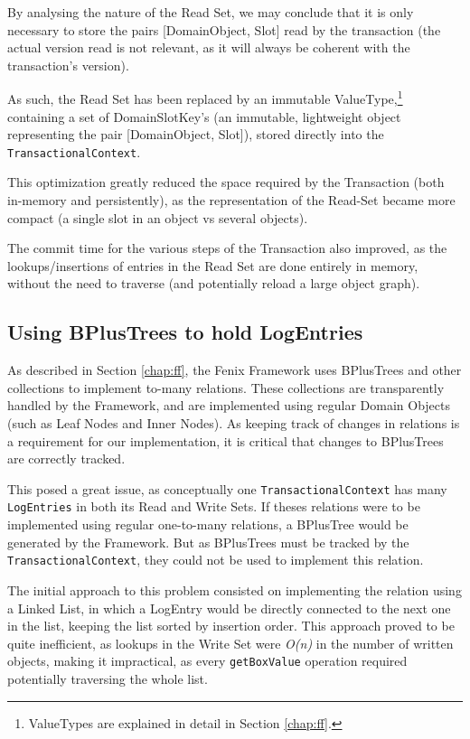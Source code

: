 \documentclass{llncs}
\begin{document}
By analysing the nature of the Read Set, we may conclude that it is
only necessary to store the pairs [DomainObject, Slot] read by the
transaction (the actual version read is not relevant, as it will
always be coherent with the transaction's version).

As such, the Read Set has been replaced by an immutable
ValueType,\footnote{ValueTypes are explained in detail in Section
  \ref{chap:ff}.} containing a set of DomainSlotKey's (an immutable,
lightweight object representing the pair [DomainObject, Slot]), stored
directly into the \texttt{TransactionalContext}.

This optimization greatly reduced the space required by the
Transaction (both in-memory and persistently), as the representation
of the Read-Set became more compact (a single slot in an object vs
several objects).

The commit time for the various steps of the Transaction also
improved, as the lookups/insertions of entries in the Read Set are
done entirely in memory, without the need to traverse (and
potentially reload a large object graph).

\subsection{Using BPlusTrees to hold LogEntries}

As described in Section \ref{chap:ff}, the Fenix Framework uses
BPlusTrees and other collections to implement to-many relations. These
collections are transparently handled by the Framework, and are
implemented using regular Domain Objects (such as Leaf Nodes and Inner
Nodes). As keeping track of changes in relations is a requirement for
our implementation, it is critical that changes to BPlusTrees are
correctly tracked.

This posed a great issue, as conceptually one
\texttt{TransactionalContext} has many \texttt{LogEntries} in both its
Read and Write Sets. If theses relations were to be implemented using
regular one-to-many relations, a BPlusTree would be generated by the
Framework. But as BPlusTrees must be tracked by the
\texttt{TransactionalContext}, they could not be used to implement
this relation.

The initial approach to this problem consisted on implementing the
relation using a Linked List, in which a LogEntry would be directly
connected to the next one in the list, keeping the list sorted by
insertion order. This approach proved to be quite inefficient, as
lookups in the Write Set were {\it O(n)} in the number of written
objects, making it impractical, as every \texttt{getBoxValue}
operation required potentially traversing the whole list.
\end{document}
